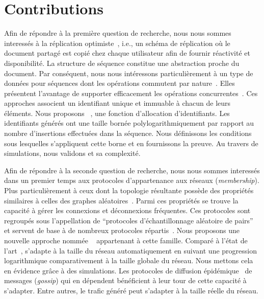 
\section{Contributions}

Afin de répondre à la première question de recherche, nous nous sommes
interessés à la réplication optimiste~\cite{demers1987epidemic,
  saito2005optimistic}, i.e., un schéma de réplication où le document partagé
est copié chez chaque utilisateur afin de fournir réactivité et
disponibilité. La structure de séquence constitue une abstraction proche du
document. Par conséquent, nous nous intéressons particulièrement à un type de
données pour séquences dont les opérations commutent par
nature~\cite{burckhardt2014replicated, shapiro2011comprehensive,
  shapiro2011conflict, zawirski2015dependable}. Elles présentent l'avantage de
supporter efficacement les opérations concurrentes~\cite{ahmed2015evaluation,
  ahmed2011evaluating}. Ces approches associent un identifiant unique et
immuable à chacun de leurs éléments. Nous proposons
\LSEQ~\cite{nedelec2013concurrency, nedelec2013lseq}, une fonction d'allocation
d'identifiants. Les identifiants générés ont une taille bornée
polylogarithmiquement par rapport au nombre d'insertions effectuées dans la
séquence. Nous définissons les conditions sous lesquelles s'appliquent cette
borne et en fournissons la preuve. Au travers de simulations, nous validons
\LSEQ et sa complexité.

Afin de répondre à la seconde question de recherche, nous nous sommes interessés
dans un premier temps aux protocoles d'appartenance aux réseaux
(\emph{membership}). Plus particulièrement à ceux dont la topologie résultante
possède des propriétés similaires à celles des graphes
aléatoires~\cite{erdos1959random}. Parmi ces propriétés se trouve la capacité à
gérer les connexions et déconnexions fréquentes. Ces protocoles sont regroupés
sous l'appellation de ``protocoles d'échantillonnage aléatoire de
pairs''~\cite{jelasity2004peer, jelasity2007gossip} et servent de base à de
nombreux protocoles répartis~\cite{dabek2004vivaldi, folz2016cyclades,
  montresor2005chord}. Nous proposons une nouvelle approche nommée
\SPRAY~\cite{nedelec2015spray} appartenant à cette famille. Comparé à l'état de
l'art~\cite{eugster2003lightweight, ganesh2001scamp, jelasity2007gossip,
  leitao2007dependable, tolgyeski2009adaptive, voulgaris2005cyclon}, \SPRAY
s'adapte à la taille du réseau automatiquement en suivant une progression
logarithmique comparativement à la taille globale du réseau. Nous mettons cela
en évidence grâce à des simulations.  Les protocoles de diffusion
épidémique~\cite{birman1999bimodal} de messages (\emph{gossip}) qui en dépendent
bénéficient à leur tour de cette capacité à s'adapter. Entre autres, le trafic
généré peut s'adapter à la taille réelle du réseau.

